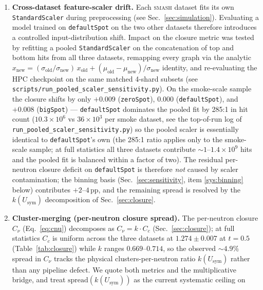 \documentclass[aps,prc,twocolumn,superscriptaddress,showpacs,%
               nofootinbib,floatfix,longbibliography]{revtex4-2}
\newcommand{\Usym}{U_{\text{sym}}}
\newcommand{\SMASH}{\textsc{smash}}
\begin{document}
\begin{enumerate}
  \item \textbf{Cross-dataset feature-scaler drift.}
    Each \SMASH{} dataset fits its own \texttt{StandardScaler} during
    preprocessing (see Sec.~\ref{sec:simulation}).  Evaluating a model
    trained on \texttt{defaultSpot} on the two other datasets
    therefore introduces a controlled input-distribution shift.
    Impact on the closure metric was tested by refitting a pooled
    \texttt{StandardScaler} on the concatenation of top and bottom
    hits from all three datasets, remapping every graph via the
    analytic $x_{\text{new}} = (\sigma_{\text{old}}/\sigma_{\text{new}})\,x_{\text{old}} + (\mu_{\text{old}} - \mu_{\text{new}})/\sigma_{\text{new}}$
    identity, and re-evaluating the HPC checkpoint on the same
    matched 4-shard subsets (see
    \texttt{scripts/run\_pooled\_scaler\_sensitivity.py}).  On the
    smoke-scale sample the closure shifts by only $+0.009$
    (\texttt{zeroSpot}), $0.000$ (\texttt{defaultSpot}), and $+0.008$
    (\texttt{bigSpot}) --- \texttt{defaultSpot} dominates the pooled
    fit by 285:1 in hit count ($10.3\times 10^{6}$ vs $36\times 10^{3}$
    per smoke dataset, see the top-of-run log of
    \texttt{run\_pooled\_scaler\_sensitivity.py}) so the pooled
    scaler is essentially identical to \texttt{defaultSpot}'s own
    (the 285:1 ratio applies only to the smoke-scale sample; at full
    statistics all three datasets contribute
    $\sim 1$--$1.4 \times 10^{9}$ hits and the pooled fit is
    balanced within a factor of two).  The residual per-neutron
    closure deficit on \texttt{defaultSpot} is therefore \emph{not}
    caused by scaler contamination; the binning basis
    (Sec.~\ref{sec:sensitivity}, item \ref{sys:binning} below)
    contributes $+2$--$4$\,pp, and the remaining spread is resolved
    by the $k(\Usym)$ decomposition of Sec.~\ref{sec:closure}.
  \item \textbf{Cluster-merging (per-neutron closure spread).}
    The per-neutron closure $C_\nu$ (Eq.~\ref{eq:cnu}) decomposes as
    $C_\nu = k \cdot C_c$ (Sec.~\ref{sec:closure}); at full statistics
    $C_c$ is uniform across the three datasets at $1.274 \pm 0.007$
    at $t = 0.5$ (Table~\ref{tab:closure}) while $k$ ranges
    $0.669$--$0.714$, so the observed $\sim 4.9\%$ spread in
    $C_\nu$ tracks the physical clusters-per-neutron ratio
    $k(\Usym)$ rather than any pipeline defect.  We quote both
    metrics and the multiplicative bridge, and treat
    $\text{spread}(k(\Usym))$ as the current systematic ceiling on

\end{enumerate}
\end{document}
